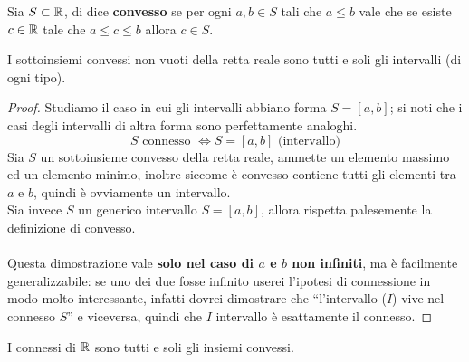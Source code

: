 \begin{definition}
	Sia $S \subset \mathbb{R}$, di dice \textbf{convesso} se per ogni $a, b\in S$ tali che $a \le b$ vale che se esiste $c\in \mathbb{R}$ tale che $a\le c\le b$ allora $c\in S$.
\end{definition} 
\begin{theorem}
	I sottoinsiemi convessi non vuoti della retta reale sono tutti e soli gli intervalli (di ogni tipo).
\end{theorem}
\begin{proof} Studiamo il caso in cui gli intervalli abbiano forma $S=[a,b]$; si noti che i casi degli intervalli di altra forma sono perfettamente analoghi.
	\begin{equation*}
	S \text{ connesso } \iff S=[a,b] \text{ (intervallo)}
	\end{equation*}
	Sia $S$ un sottoinsieme convesso della retta reale, ammette un elemento massimo ed un elemento minimo, inoltre siccome è convesso contiene tutti gli elementi tra $a$ e $b$, quindi è ovviamente un intervallo. \\ Sia invece $S$ un generico intervallo $S=[a,b]$, allora rispetta palesemente la definizione di convesso. \\ \\ Questa dimostrazione vale \textbf{solo nel caso di $a$ e $b$ non infiniti}, ma è facilmente generalizzabile: se uno dei due fosse infinito userei l'ipotesi di connessione in modo molto interessante, infatti dovrei dimostrare che \enquote{l'intervallo ($I$) vive nel connesso $S$} e viceversa, quindi che $I$ intervallo è esattamente il connesso.
\end{proof}
\begin{theorem}
	I connessi di $\mathbb{R}$ sono tutti e soli gli insiemi convessi. 
\end{theorem}
